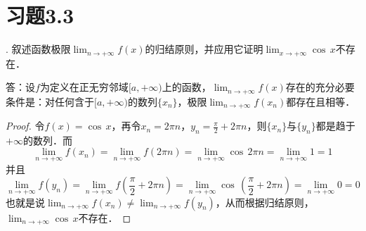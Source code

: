 \documentclass{ctexart}
\theoremstyle{definition}
\theoremstyle{definition}
\theoremstyle{plain}
\theoremstyle{plain}
\theoremstyle{plain}
\theoremstyle{definition}
\begin{document}
\section*{习题3.3}
. 叙述函数极限$\displaystyle\lim_{n\to +\infty} f(x)$的归结原则，并应用它证明$\displaystyle\lim_{x \to +\infty} \cos \, x$不存在．

\noindent 答：设$f$为定义在正无穷邻域$[a, +\infty)$上的函数，$\displaystyle\lim_{n\to +\infty} f(x)$存在的充分必要条件是：对任何含于$[a, +\infty)$的数列$\{x_n\}$，极限$\displaystyle\lim_{n\to +\infty} f(x_n)$都存在且相等．

\begin{proof}
令$f(x) = \cos \, x$，再令$x_n = 2\pi n$，$y_n = \displaystyle\frac{\pi}{2} + 2\pi n$，则$\{x_n\}$与$\{y_n\}$都是趋于$+\infty$的数列．而
\begin{equation}
    \lim_{n \to +\infty} f(x_n) = \lim_{n \to +\infty} f(2 \pi n) = \lim_{n\to +\infty} \cos \, 2\pi n = \lim_{n \to +\infty} 1 = 1
\end{equation}
并且
\begin{equation}
    \lim_{n \to +\infty} f(y_n) = \lim_{n \to +\infty} f(\frac{\pi}{2} + 2 \pi n) = \lim_{n \to +\infty} \cos \, \left(\frac{\pi}{2}+2 \pi n\right) = \lim_{n \to +\infty} 0 = 0
\end{equation}
也就是说$\displaystyle \lim_{n\to +\infty} f(x_n) \neq \lim_{n \to +\infty} f(y_n)$，从而根据归结原则，$\displaystyle\lim_{n \to +\infty} \cos \, x$不存在．
\end{proof}
\end{document}
